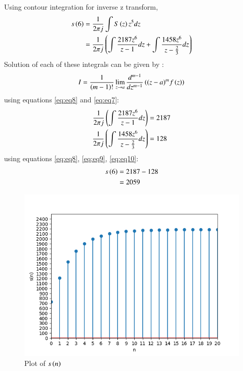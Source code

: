 \documentclass[journal,12pt,twocolumn]{IEEEtran}
\theoremstyle{remark}
\begin{document}
Using contour integration for inverse z transform,
\begin{align}
    s\left(6\right) &= \frac{1}{2\pi j}\int S\left(z\right) z^{5} dz\\
    &= \frac{1}{2\pi j}\left(\int\frac{2187z^{6}}{z-1}dz + \int\frac{1458z^{6}}{z - \frac{2}{3}} dz\right) \label{eq:eq8}
\end{align}
Solution of each of these integrals can be given by :
\begin{align}
    I =\frac{1}{\left(m-1\right)!}\lim\limits_{z\to a}\frac{d^{m-1}}{dz^{m-1}}\left({(z-a)}^{m}f\left(z\right)\right) \label{eq:eq7}
\end{align}
using equations \eqref{eq:eq8} and \eqref{eq:eq7}:
\begin{align}
    \frac{1}{2\pi j}\left(\int\frac{2187z^{6}}{z - 1}dz\right) &= 2187\label{eq:eq9}\\
     \frac{1}{2\pi j}\left(\int\frac{1458z^{6}}{z - \frac{2}{3}}dz\right)  &= 128\label{eq:eq10}
     \end{align}
using equations \eqref{eq:eq8}, \eqref{eq:eq9}, \eqref{eq:eq10}:
\begin{align}
s\left(6\right) &= 2187 - 128\\
&= 2059
\end{align}
\begin{figure}[!ht]
\centering
\begin{center}
\includegraphics[width=\columnwidth]{Figure_1}
\caption{Plot of $s\left(n\right)$}
\end{center}
\end{figure}
\end{document}
